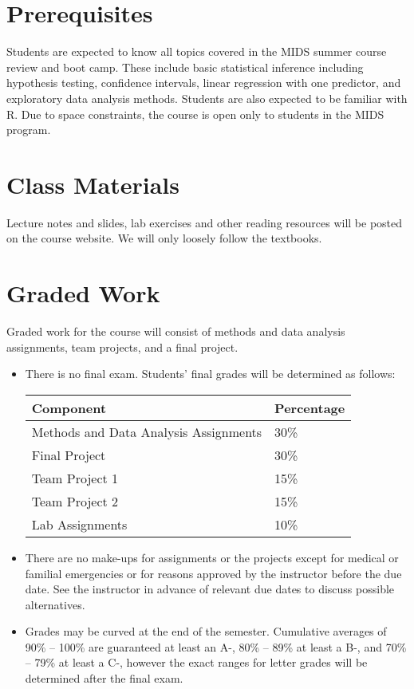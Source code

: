 \documentclass[11pt, a4paper]{article}
\begin{document}
\section{Prerequisites}
Students are expected to know all topics covered in the MIDS summer course review and boot camp. These include basic statistical inference including hypothesis testing, confidence intervals, linear regression with one predictor, and exploratory data analysis methods. Students are also expected to be familiar with \textsf{R}. Due to space constraints, the course is open only to students in the MIDS program.


\section{Class Materials}
Lecture notes and slides, lab exercises and other reading resources will be posted on the course website. We will only loosely follow the textbooks.


\section{Graded Work} 
Graded work for the course will consist of methods and data analysis assignments, team projects, and a final project. 
\begin{itemize}[label= {\color{darkblue}{\ArrowBoldRightStrobe}}]
	\item There is no final exam. Students' final grades will be determined as follows:
	\begin{table}[h]
		\centering
		\begin{tabular}{ll}
			Component & Percentage \\ \hline
			Methods and Data Analysis Assignments & 30\% \\
			Final Project & 30\% \\ 
			Team Project 1 & 15\% \\
			Team Project 2 & 15\% \\
			Lab Assignments & 10\% \\ \hline 
		\end{tabular}
	\end{table}
	
	\item There are no make-ups for assignments or the projects except for medical or familial emergencies or for reasons approved by the instructor before the due date. See the instructor in advance of relevant due dates to discuss possible alternatives. 
	
	\item Grades may be curved at the end of the semester. Cumulative averages of 90\% -- 100\% are guaranteed at least an A-, 80\% -- 89\% at least a B-, and 70\% -- 79\% at least a C-, however the exact ranges for letter grades will be determined after the final exam. 
\end{itemize}
\end{document}

